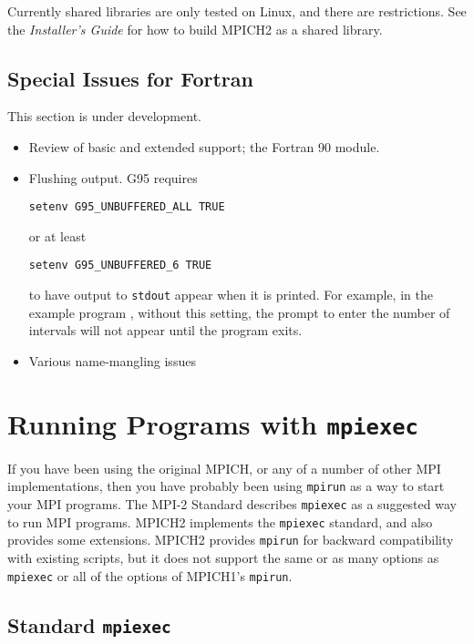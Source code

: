 \documentclass[dvipdfm,11pt]{article}
\begin{document}
Currently shared libraries are only tested on Linux, and there are
restrictions.  See the \emph{Installer's Guide} for how to build MPICH2
as a shared library.

\subsection{Special Issues for Fortran}
\label{sec:fortran}
This section is under development.

\begin{itemize}
\item Review of basic and extended support; the Fortran 90 module.
\item Flushing output.
G95 requires 
\begin{verbatim}
setenv G95_UNBUFFERED_ALL TRUE
\end{verbatim}
or at least
\begin{verbatim}
setenv G95_UNBUFFERED_6 TRUE
\end{verbatim}
to have output to \texttt{stdout} appear when it is printed.  For
example, in the example program , without
this setting, the prompt to enter the number of intervals will not
appear until the program exits.

\item Various name-mangling issues
\end{itemize}


\section{Running Programs with \texttt{mpiexec}}
\label{sec:mpiexec}

If you have been using the original MPICH, or any of a number of other MPI
implementations, then you have probably been using \texttt{mpirun} as a
way to start your MPI programs.
The MPI-2 Standard describes \texttt{mpiexec} as a suggested way to run
MPI programs.  MPICH2 implements the \texttt{mpiexec} standard, and also
provides some extensions.  MPICH2 provides \texttt{mpirun} for backward
compatibility with existing scripts, but it does not support the same or
as many options as \texttt{mpiexec} or all of the options of MPICH1's
\texttt{mpirun}.   

\subsection{Standard \texttt{mpiexec}}
\label{sec:mpiexec-standard}
\end{document}
